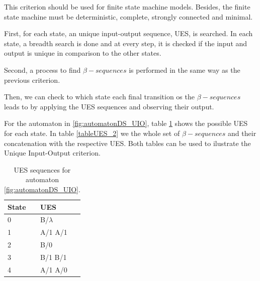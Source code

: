 \begin{itemize}
This criterion should be used for finite state machine models. Besides, the finite state machine must be deterministic, complete, strongly connected and minimal. 

First, for each state, an unique input-output sequence, UES, is searched. In each state, a breadth search is done and at every step, it is checked if the input and output is unique in comparison to the other states.

Second, a process to find $\beta-sequences$ is performed in the same way as the previous criterion.

Then, we can check to which state each final transition os the $\beta-sequences$ leads to by applying the UES sequences and observing their output.

For the automaton in \ref{fig:automatonDS_UIO}, table \ref{tableUES_1} shows the possible UES for each state. In table \ref{tableUES_2} we the whole set of $\beta-sequences$ and their concatenation with the respective UES. Both tables can be used to ilustrate the Unique Input-Output criterion.

\end{itemize}

\begin{table}
\begin{center}
\begin{tabular}{| l | l|}

\hline

State & UES \\ \hline

0 & B/$\lambda$\\ \hline
1 & A/1 A/1\\ \hline
2 & B/0\\ \hline
3 & B/1 B/1\\ \hline
4 & A/1 A/0\\

\hline
\end{tabular}
\end{center}
\caption{UES sequences for automaton \ref{fig:automatonDS_UIO}.\cite{inpe10}}
\label{tableUES_1}
\end{table}

